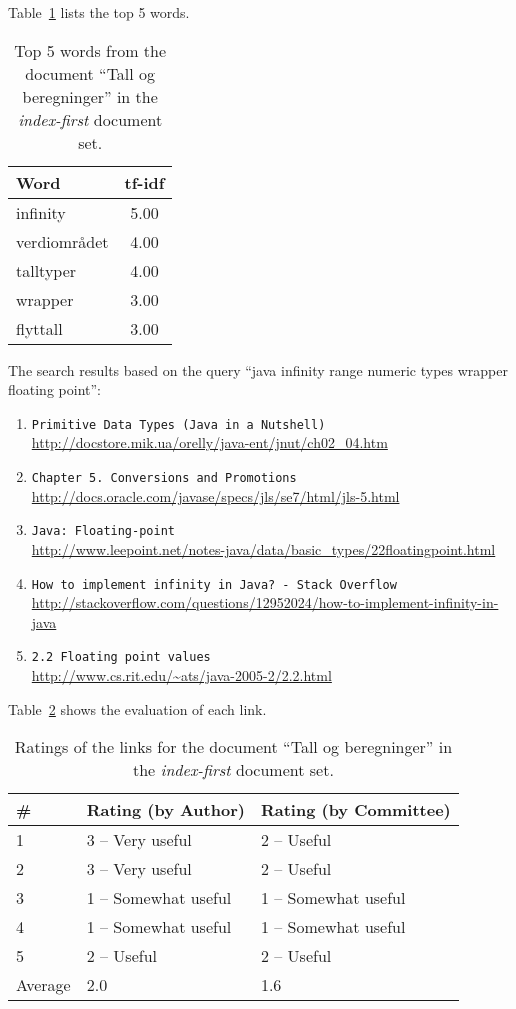 Table~\ref{tab:topWords-no-tall-og-beregninger-2} lists the top 5 words.
\begin{table}[H]
\centering
\begin{tabular}{|l|c|}
\hline\hline
    Word & tf-idf \\
\hline
    infinity & 5.00 \\
    verdiområdet & 4.00 \\
    talltyper & 4.00 \\
    wrapper & 3.00 \\
    flyttall & 3.00 \\
\hline\hline
\end{tabular}
\caption{Top 5 words from the document ``Tall og beregninger'' in the \textit{index-first} document set.}
\label{tab:topWords-no-tall-og-beregninger-2}
\end{table}

The search results based on the query ``java infinity range numeric types wrapper floating point'':

\begin{enumerate}
\item
    \verb|Primitive Data Types (Java in a Nutshell)| \\
    \url{http://docstore.mik.ua/orelly/java-ent/jnut/ch02_04.htm}
\item
    \verb|Chapter 5. Conversions and Promotions| \\
    \url{http://docs.oracle.com/javase/specs/jls/se7/html/jls-5.html}
\item
    \verb|Java: Floating-point| \\
    \url{http://www.leepoint.net/notes-java/data/basic_types/22floatingpoint.html}
\item
    \verb|How to implement infinity in Java? - Stack Overflow| \\
    \url{http://stackoverflow.com/questions/12952024/how-to-implement-infinity-in-java}
\item
    \verb|2.2 Floating point values| \\
    \url{http://www.cs.rit.edu/~ats/java-2005-2/2.2.html}
\end{enumerate}

Table~\ref{tab:ratings-no-tall-og-beregninger-2} shows the evaluation of each link.
\begin{table}[H]
\centering
\begin{tabular}{|l|l|l|}
\hline\hline
    \# & Rating (by Author) & Rating (by Committee) \\
\hline
    1 & 3 -- Very useful & 2 -- Useful \\
    2 & 3 -- Very useful & 2 -- Useful \\
    3 & 1 -- Somewhat useful & 1 -- Somewhat useful \\
    4 & 1 -- Somewhat useful & 1 -- Somewhat useful \\
    5 & 2 -- Useful & 2 -- Useful \\
\hline
    Average & 2.0 & 1.6 \\
\hline\hline
\end{tabular}
\caption{Ratings of the links for the document ``Tall og beregninger'' in the \textit{index-first} document set.}
\label{tab:ratings-no-tall-og-beregninger-2}
\end{table}